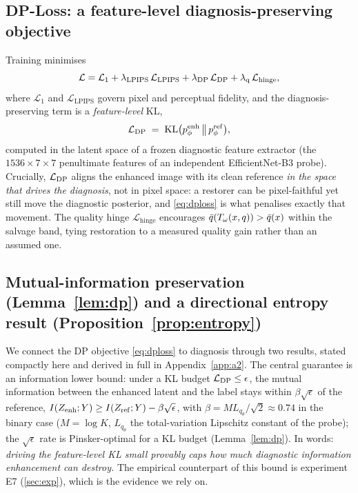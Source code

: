 \subsection{DP-Loss: a feature-level diagnosis-preserving objective}\label{sec:dploss}
Training minimises
\begin{equation}
\mathcal{L}=\mathcal{L}_1
  +\lambda_{\mathrm{LPIPS}}\,\mathcal{L}_{\mathrm{LPIPS}}
  +\lambda_{\mathrm{DP}}\,\mathcal{L}_{\mathrm{DP}}
  +\lambda_{\mathrm{q}}\,\mathcal{L}_{\mathrm{hinge}},
\label{eq:total-loss}
\end{equation}
where $\mathcal{L}_1$ and $\mathcal{L}_{\mathrm{LPIPS}}$ govern pixel and perceptual fidelity, and the
diagnosis-preserving term is a \emph{feature-level} KL,
\begin{equation}
\mathcal{L}_{\mathrm{DP}} \;=\; \operatorname{KL}\!\big(p_\phi^{\mathrm{enh}} \,\big\|\, p_\phi^{\mathrm{ref}}\big),
\label{eq:dploss}
\end{equation}
computed in the latent space of a frozen diagnostic feature extractor (the $1536\times7\times7$
penultimate features of an independent EfficientNet-B3 probe). Crucially, $\mathcal{L}_{\mathrm{DP}}$ aligns the enhanced
image with its clean reference \emph{in the space that drives the diagnosis}, not in pixel space: a
restorer can be pixel-faithful yet still move the diagnostic posterior, and \eqref{eq:dploss} is what
penalises exactly that movement. The quality hinge $\mathcal{L}_{\mathrm{hinge}}$ encourages
$\bar{q}(T_\omega(x,q))>\bar{q}(x)$ within the salvage band, tying restoration to a measured quality gain rather
than an assumed one.

\subsection{Mutual-information preservation (Lemma~\ref{lem:dp}) and a directional entropy result
(Proposition~\ref{prop:entropy})}\label{sec:prop3lemma3}
We connect the DP objective \eqref{eq:dploss} to diagnosis through two results, stated compactly here
and derived in full in Appendix~\ref{app:a2}. The central guarantee is an information lower bound: under
a KL budget $\mathcal{L}_{\mathrm{DP}}\leq\epsilon$, the mutual information between the enhanced latent and the label stays
within $\beta\sqrt{\epsilon}$ of the reference, $I(Z_{\mathrm{enh}};Y)\geq I(Z_{\mathrm{ref}};Y)-\beta\sqrt{\epsilon}$, with
$\beta=M L_{q_\theta}/\sqrt{2}\approx0.74$ in the binary case ($M=\log K$, $L_{q_\theta}$ the
total-variation Lipschitz constant of the probe); the $\sqrt{\epsilon}$ rate is Pinsker-optimal for a KL
budget (Lemma~\ref{lem:dp}). In words: \emph{driving the feature-level KL small provably caps how much
diagnostic information enhancement can destroy.} The empirical counterpart of this bound is experiment
E7 (\cref{sec:exp}), which is the evidence we rely on.

